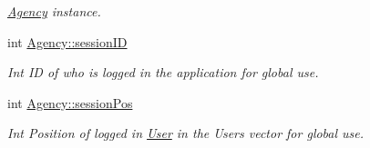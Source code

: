 \begin{DoxyCompactItemize}
\begin{DoxyCompactList}\small\item\em \hyperlink{class_agency}{Agency} instance. \end{DoxyCompactList}\item 
\mbox{\label{group___agency_gadd64fcf15e317225aab8d7e66a113cdd}} 
int \hyperlink{group___agency_gadd64fcf15e317225aab8d7e66a113cdd}{Agency\+::session\+ID}
\begin{DoxyCompactList}\small\item\em Int ID of who is logged in the application for global use. \end{DoxyCompactList}\item 
\mbox{\label{group___agency_ga07004d662bede4bad0f673a0f93a9858}} 
int \hyperlink{group___agency_ga07004d662bede4bad0f673a0f93a9858}{Agency\+::session\+Pos}
\begin{DoxyCompactList}\small\item\em Int Position of logged in \hyperlink{class_user}{User} in the Users vector for global use. \end{DoxyCompactList}\end{DoxyCompactItemize}
